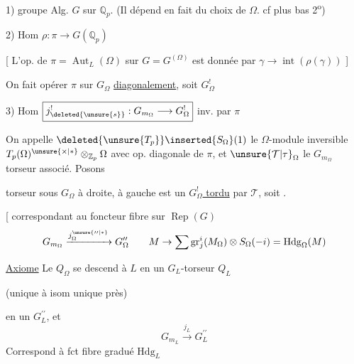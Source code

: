 1) groupe Alg. $\boxed{G}$ sur $\mathbb Q_p$. (Il dépend en fait du choix de $\Omega$. cf plus bas 2\textsuperscript{o})

2) Hom \(\boxed{\rho:\pi\longrightarrow G(\mathbb Q_p)}\)

[ L’op. de $\pi=\operatorname{Aut}_L(\Omega)$ sur $G=G^{(\Omega)}$ est donnée par $\gamma\to\operatorname{int}(\rho(\gamma))$ ]

 On fait opérer $\pi$ sur $G_\Omega$ \uline{diagonalement}, soit $G_\Omega^{!}$

3) Hom \(\boxed{j_{\deleted{\unsure{s}}}^{!}:G_{m_\Omega}\longrightarrow G_\Omega^{!}}\) \qquad inv. par $\pi$
\reversemarginpar{}\normalmarginpar

On appelle $\deleted{\unsure{T_p}}\inserted{S_\Omega}(1)$  le  $\Omega$-module inversible $T_p(\Omega)^{\unsure{\times|\ast}}\otimes_{\mathbb Z_p}\Omega$ avec op. diagonale de $\pi$,  et $\unsure{\mathcal T|\tau}_\Omega$ le $G_{m_\Omega}$ torseur associé. Posons

 torseur  sous $G_\Omega$ à droite, à gauche est un \uline{$G_\Omega^{!}$ tordu} par $\mathcal T$, soit .

[ correspondant au foncteur fibre  sur $\operatorname{Rep}(G)$
\[
G_{m_\Omega}\xrightarrow{j_\Omega^{\unsure{\prime\prime|\ast}}}G_\Omega^{\prime\prime}
\qquad M\to\sum\operatorname{gr}^{i}_{j}(M_\Omega)\otimes S_\Omega(-i)=\mathrm{Hdg}_\Omega(M)
\]

\unsure{$\subset$} \uline{Axiome} Le  $Q_\Omega$  se descend à $L$ en un $G_L$-torseur $Q_L$

\begin{center}\end{center}

(unique à isom unique près)

en un $G_L^{\prime\prime}$, et
\[
G_{m_L}\xrightarrow{j_L}G_L^{\prime\prime}
\]
Correspond à fct fibre gradué $\mathrm{Hdg}_L$

